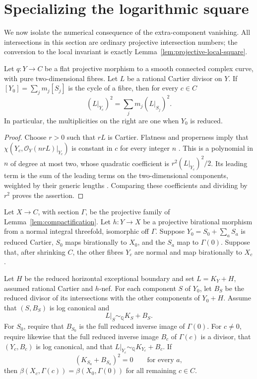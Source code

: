 \section{Specializing the logarithmic square}
\label{sec:square-specialization}

We now isolate the numerical consequence of the extra-component
vanishing.  All intersections in this section are ordinary projective
intersection numbers; the conversion to the local invariant is exactly
Lemma~\ref{lem:projective-local-square}.

\begin{lemma}
\label{lem:square-specialization}
Let $q:Y\to C$ be a flat projective morphism to a smooth connected
complex curve, with pure two-dimensional fibres.  Let $L$ be a
rational Cartier divisor on $Y$.  If
$[Y_0]=\sum_j m_j[S_j]$ is the cycle of a fibre, then for every $c\in C$
\[
 (L|_{Y_c})^2=\sum_j m_j(L|_{S_j})^2.
\]
In particular, the multiplicities on the right are one when $Y_0$ is
reduced.
\end{lemma}

\begin{proof}
Choose $r>0$ such that $rL$ is Cartier.  Flatness and properness imply
that $\chi(Y_c,\mathcal O_Y(nrL)|_{Y_c})$ is constant in $c$ for every
integer $n$ \cite[Lemma~36.32.2]{StacksProject}.  This is a polynomial
in $n$ of degree at most two, whose quadratic coefficient is
$r^2(L|_{Y_c})^2/2$.  Its leading term is the sum of the leading terms
on the two-dimensional components, weighted by their generic lengths
\cite[Lemmas~33.45.1, 33.45.2 and 33.45.6]{StacksProject}.  Comparing
these coefficients and dividing by $r^2$ proves the assertion.
\end{proof}

\begin{proposition}
\label{prop:beta-from-log-model}
Let $X\to C$, with section $\Gamma$, be the projective family of
Lemma~\ref{lem:compactification}.  Let $h:Y\to X$ be a projective
birational morphism from a normal integral threefold, isomorphic off
$\Gamma$.  Suppose $Y_0=S_0+\sum_a S_a$ is reduced Cartier, $S_0$
maps birationally to $X_0$, and the $S_a$ map to $\Gamma(0)$.  Suppose
that, after shrinking $C$, the other fibres $Y_c$ are normal and map
birationally to $X_c$.

Let $H$ be the reduced horizontal exceptional boundary and set
$L=K_Y+H$, assumed rational Cartier and $h$-nef.  For each component
$S$ of $Y_0$, let $B_S$ be the reduced divisor of its intersections
with the other components of $Y_0+H$.  Assume that $(S,B_S)$ is log
canonical and
\[
 L|_S\sim_{\mathbb Q} K_S+B_S.
\]
For $S_0$, require that $B_{S_0}$ is the full reduced inverse image of
$\Gamma(0)$.  For $c\ne0$, require likewise that the full reduced
inverse image $B_c$ of $\Gamma(c)$ is a divisor, that $(Y_c,B_c)$ is
log canonical, and that
$L|_{Y_c}\sim_{\mathbb Q}K_{Y_c}+B_c$.
If
\[
 (K_{S_a}+B_{S_a})^2=0\qquad\text{for every }a,
\]
then $\beta(X_c,\Gamma(c))=\beta(X_0,\Gamma(0))$ for all remaining
$c\in C$.
\end{proposition}

